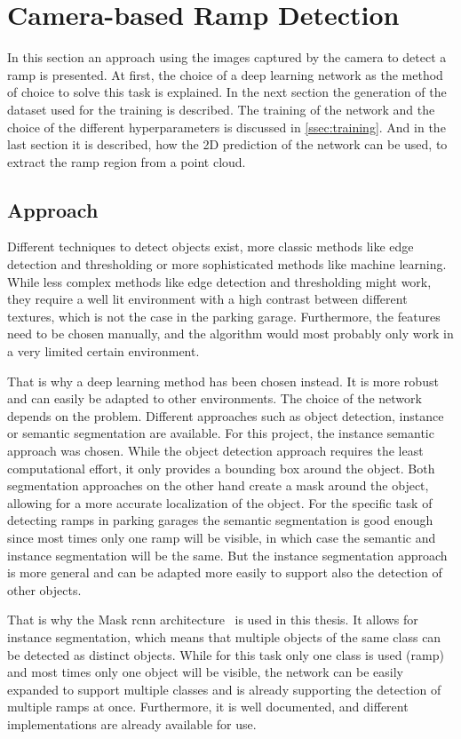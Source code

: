 \section{Camera-based Ramp Detection}
\label{sec:methods_camera}
In this section an approach using the images captured by the camera to detect a ramp is presented.
At first, the choice of a deep learning network as the method of choice to solve this task is explained.
In the next section the generation of the dataset used for the training is described.
The training of the network and the choice of the different hyperparameters is discussed in \cref{ssec:training}.
And in the last section it is described, how the 2D prediction of the network can be used, to extract the ramp region from a point cloud.

\subsection{Approach}
Different techniques to detect objects exist, more classic methods like edge detection and thresholding or more sophisticated methods like machine learning.
While less complex methods like edge detection and thresholding might work, they require a well lit environment with a high contrast between different textures, which is not the case in the parking garage.
Furthermore, the features need to be chosen manually, and the algorithm would most probably only work in a very limited certain environment.

That is why a deep learning method has been chosen instead.
It is more robust and can easily be adapted to other environments.
The choice of the network depends on the problem.
Different approaches such as object detection, instance or semantic segmentation are available.
For this project, the instance semantic approach was chosen.
While the object detection approach requires the least computational effort, it only provides a bounding box around the object.
Both segmentation approaches on the other hand create a mask around the object, allowing for a more accurate localization of the object.
For the specific task of detecting ramps in parking garages the semantic segmentation is good enough since most times only one ramp will be visible, in which case the semantic and instance segmentation will be the same.
But the instance segmentation approach is more general and can be adapted more easily to support also the detection of other objects.

That is why the Mask \gls{rcnn} architecture~\cite{He2017} is used in this thesis.
It allows for instance segmentation, which means that multiple objects of the same class can be detected as distinct objects.
While for this task only one class is used (ramp) and most times only one object will be visible, the network can be easily expanded to support multiple classes and is already supporting the detection of multiple ramps at once.
Furthermore, it is well documented, and different implementations are already available for use.

